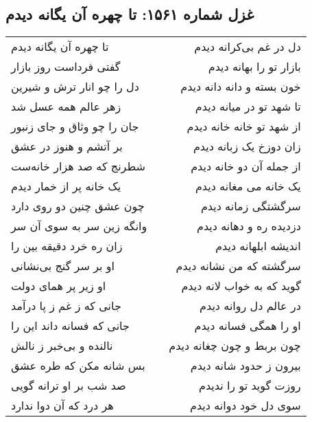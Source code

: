 \begin{center}
\section*{غزل شماره ۱۵۶۱: تا چهره آن یگانه دیدم}
\label{sec:1561}
\begin{longtable}{l p{0.5cm} r}
تا چهره آن یگانه دیدم
&&
دل در غم بی‌کرانه دیدم
\\
گفتی فرداست روز بازار
&&
بازار تو را بهانه دیدم
\\
دل را چو انار ترش و شیرین
&&
خون بسته و دانه دانه دیدم
\\
زهر عالم همه عسل شد
&&
تا شهد تو در میانه دیدم
\\
جان را چو وثاق و جای زنبور
&&
از شهد تو خانه خانه دیدم
\\
بر آتشم و هنوز در عشق
&&
زان دوزخ یک زبانه دیدم
\\
شطرنج که صد هزار خانه‌ست
&&
از جمله آن دو خانه دیدم
\\
یک خانه پر از خمار دیدم
&&
یک خانه می مغانه دیدم
\\
چون عشق چنین دو روی دارد
&&
سرگشتگی زمانه دیدم
\\
وانگه زین سر به سوی آن سر
&&
دزدیده ره و دهانه دیدم
\\
زان ره خرد دقیقه بین را
&&
اندیشه ابلهانه دیدم
\\
او بر سر گنج بی‌نشانی
&&
سرگشته که من نشانه دیدم
\\
او زیر پر همای دولت
&&
گوید که به خواب لانه دیدم
\\
جانی که ز غم ز پا درآمد
&&
در عالم دل روانه دیدم
\\
جانی که فسانه داند این را
&&
او را همگی فسانه دیدم
\\
نالنده و بی‌خبر ز نالش
&&
چون بربط و چون چغانه دیدم
\\
بس شانه مکن که طره عشق
&&
بیرون ز حدود شانه دیدم
\\
صد شب بر او ترانه گویی
&&
روزت گوید تو را ندیدم
\\
هر درد که آن دوا ندارد
&&
سوی دل خود دوانه دیدم
\\
\end{longtable}
\end{center}
